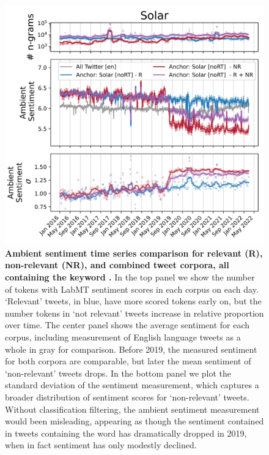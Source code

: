 \begin{figure}[tp!]
  \centering	
    \includegraphics[width=0.98\columnwidth]{figures/Solar_sentiment_2016-01-01_2022-03-15.png}  
  \caption{
    \textbf{Ambient sentiment time series comparison for relevant  (R), non-relevant (NR), and combined tweet corpora, all containing the keyword .}
    In the top panel we show the number of tokens with LabMT \cite{dodds2015human} sentiment scores in each corpus on each day.
    `Relevant' tweets, in blue, have more scored tokens early on,
    but the number tokens in `not relevant' tweets increase in relative proportion over time.
    The center panel shows the average sentiment for each corpus, including measurement of English language tweets as a whole in gray for comparison. 
    Before 2019, the measured sentiment for both corpora are comparable, but later the mean sentiment of `non-relevant' tweets drops. 
    In the bottom panel we plot the standard deviation of the sentiment measurement, which captures a broader distribution of sentiment scores for  `non-relevant' tweets.
    Without classification filtering, the ambient sentiment measurement would been misleading, appearing as though the sentiment contained in tweets containing the word  has dramatically dropped in 2019, when in fact sentiment has only modestly declined. 
  }
  \label{fig:solar_sentiment}
\end{figure}


